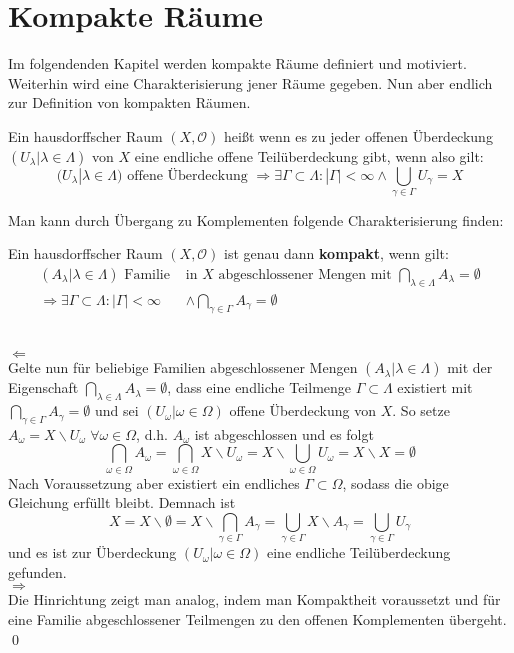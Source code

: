 \chapter{Kompakte Räume}
Im folgendenden Kapitel werden kompakte Räume definiert und motiviert. Weiterhin wird eine Charakterisierung jener Räume gegeben.
Nun aber endlich zur Definition von kompakten Räumen.

\begin{Def}[Kompaktheit]
	Ein hausdorffscher Raum \((X, \mathcal{O})\) heißt  wenn es zu jeder offenen Überdeckung 
	\((U_{\lambda} | \lambda \in \Lambda)\) von \(X\) eine endliche offene Teilüberdeckung gibt, wenn also gilt:
	\[ (U_{\lambda} | \lambda \in \Lambda) \mbox{ offene Überdeckung }
     \Rightarrow \exists \Gamma \subset \Lambda : |\Gamma| < \infty \land \bigcup_{\gamma \in \Gamma} U_{\gamma} = X \] 
\end{Def}
Man kann durch Übergang zu Komplementen folgende Charakterisierung finden:

\begin{Satz}
	Ein hausdorffscher Raum \((X, \mathcal{O})\) ist genau dann \textbf{kompakt}, wenn gilt:
	\begin{align*}
		(A_{\lambda}| \lambda \in \Lambda) \mbox{ Familie } & \mbox{in } X \mbox{ abgeschlossener Mengen mit } 
		\bigcap_{\lambda \in \Lambda} A_{\lambda} = \emptyset \\
		\Rightarrow \exists \Gamma \subset \Lambda : |\Gamma| < \infty & \land \bigcap_{\gamma \in \Gamma} A_{\gamma} = \emptyset
	\end{align*} 
\end{Satz}
	\\
	\glqq\(\Leftarrow\)\grqq
	\\
	Gelte nun für beliebige Familien abgeschlossener Mengen \((A_{\lambda}| \lambda \in \Lambda)\) mit der Eigenschaft
	\(\bigcap_{\lambda \in \Lambda} A_{\lambda} = \emptyset\), dass eine endliche Teilmenge \(\Gamma \subset \Lambda\) existiert mit
	\(\bigcap_{\gamma \in \Gamma} A_{\gamma} = \emptyset\) und sei \( (U_{\omega} | \omega \in \Omega) \) offene Überdeckung
	von \(X\). So setze \(A_{\omega} = X \backslash U_{\omega} \; \forall \omega \in \Omega\), d.h. \(A_{\omega}\) ist abgeschlossen
	und es folgt 
	\[\bigcap_{\omega \in \Omega} A_{\omega} = \bigcap_{\omega \in \Omega} X \backslash U_{\omega} =  X \backslash 
	\bigcup_{\omega \in \Omega} U_{\omega} = X \backslash X =  \emptyset \]
	Nach Voraussetzung aber existiert ein endliches \(\Gamma \subset \Omega\), sodass die obige Gleichung erfüllt bleibt. Demnach ist 
	\[ X = X \backslash \emptyset = X \backslash \bigcap_{\gamma \in \Gamma} A_{\gamma} = \bigcup_{\gamma \in \Gamma} X \backslash A_{\gamma} = 
	\bigcup_{\gamma \in \Gamma} U_{\gamma} \] 
	und es ist zur Überdeckung \( (U_{\omega} | \omega \in \Omega) \) eine endliche Teilüberdeckung gefunden.
	\\
	\glqq\(\Rightarrow\)\grqq
	\\
	Die Hinrichtung zeigt man analog, indem man Kompaktheit voraussetzt und für eine Familie abgeschlossener Teilmengen zu den 
	offenen Komplementen übergeht.
\qed\\
%
